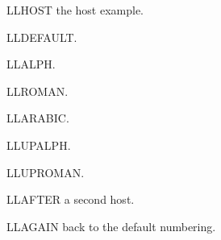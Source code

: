 

\begin{exe}
\ex LLHOST the host example.
 \begin{xlist}  \ex LLDEFAULT.  \end{xlist}
 \begin{xlista} \ex LLALPH.     \end{xlista}
 \begin{xlisti} \ex LLROMAN.    \end{xlisti}
 \begin{xlistn} \ex LLARABIC.   \end{xlistn}
 \begin{xlistA} \ex LLUPALPH.   \end{xlistA}
 \begin{xlistI} \ex LLUPROMAN.  \end{xlistI}
\end{exe}

\begin{exe}
\ex LLAFTER a second host.
 \begin{xlist} \ex LLAGAIN back to the default numbering. \end{xlist}
\end{exe}

